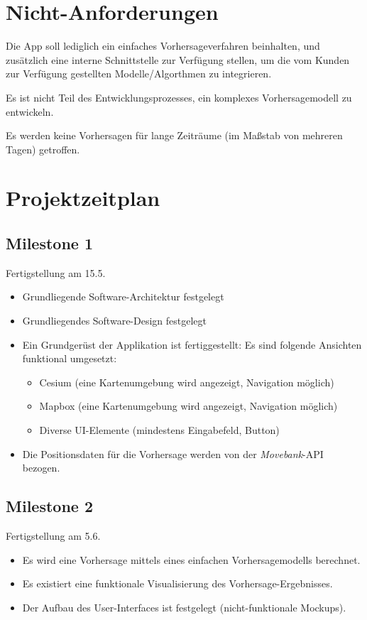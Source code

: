 \documentclass[12pt]{article} %
\begin{document}
 \section{Nicht-Anforderungen} \label{nicht-anforderungen}

Die App soll lediglich ein einfaches Vorhersageverfahren beinhalten, und zusätzlich eine interne Schnittstelle zur Verfügung stellen, um die vom Kunden zur Verfügung gestellten Modelle/Algorthmen zu integrieren.

Es ist nicht Teil des Entwicklungsprozesses, ein komplexes Vorhersagemodell zu entwickeln.

Es werden keine Vorhersagen für lange Zeiträume (im Maßstab von mehreren Tagen) getroffen.


\newpage
\section{Projektzeitplan} \label{zeitplan}

\subsection*{Milestone 1}
Fertigstellung am 15.5.
\begin{itemize} 
	\item Grundliegende Software-Architektur festgelegt
	\item Grundliegendes Software-Design festgelegt
	\item Ein Grundgerüst der Applikation ist fertiggestellt: Es sind folgende Ansichten funktional umgesetzt:
	\begin{itemize} 
		\item Cesium (eine Kartenumgebung wird angezeigt, Navigation möglich)
		\item Mapbox (eine Kartenumgebung wird angezeigt, Navigation möglich)
		\item Diverse UI-Elemente (mindestens Eingabefeld, Button)
	\end{itemize} 
	\item Die Positionsdaten für die Vorhersage werden von der \textit{Movebank}-API bezogen.
\end{itemize} 

\vspace{1em}

\subsection*{Milestone 2}
Fertigstellung am 5.6.
\begin{itemize} 
	\item Es wird eine Vorhersage mittels eines einfachen Vorhersagemodells berechnet.
	\item Es existiert eine funktionale Visualisierung des Vorhersage-Ergebnisses.
	\item Der Aufbau des User-Interfaces ist festgelegt (nicht-funktionale Mockups).
\end{itemize}
\end{document}
